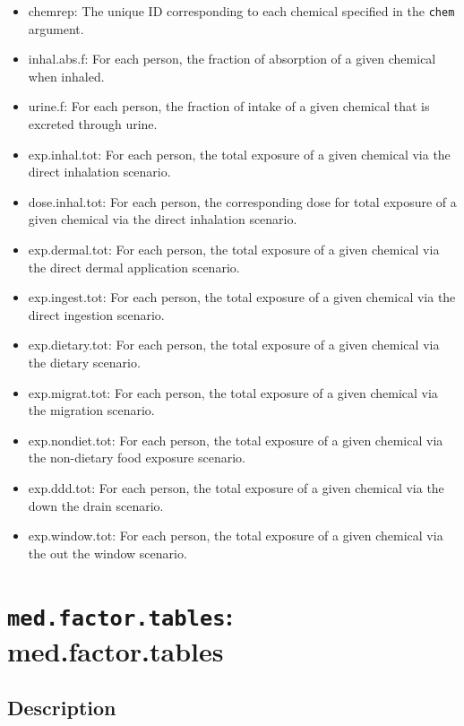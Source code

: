 \documentclass[
]{article}
\providecommand{\tightlist}{%
  \setlength{\itemsep}{0pt}\setlength{\parskip}{0pt}}
\begin{document}
\begin{itemize}
\tightlist
\item
  chemrep: The unique ID corresponding to each chemical specified in the
  \texttt{chem} argument.
\item
  inhal.abs.f: For each person, the fraction of absorption of a given
  chemical when inhaled.
\item
  urine.f: For each person, the fraction of intake of a given chemical
  that is excreted through urine.
\item
  exp.inhal.tot: For each person, the total exposure of a given chemical
  via the direct inhalation scenario.
\item
  dose.inhal.tot: For each person, the corresponding dose for total
  exposure of a given chemical via the direct inhalation scenario.
\item
  exp.dermal.tot: For each person, the total exposure of a given
  chemical via the direct dermal application scenario.
\item
  exp.ingest.tot: For each person, the total exposure of a given
  chemical via the direct ingestion scenario.
\item
  exp.dietary.tot: For each person, the total exposure of a given
  chemical via the dietary scenario.
\item
  exp.migrat.tot: For each person, the total exposure of a given
  chemical via the migration scenario.
\item
  exp.nondiet.tot: For each person, the total exposure of a given
  chemical via the non-dietary food exposure scenario.
\item
  exp.ddd.tot: For each person, the total exposure of a given chemical
  via the down the drain scenario.
\item
  exp.window.tot: For each person, the total exposure of a given
  chemical via the out the window scenario.
\end{itemize}

\hypertarget{med.factor.tables-med.factor.tables}{%
\section{\texorpdfstring{\texttt{med.factor.tables}:
med.factor.tables}{med.factor.tables: med.factor.tables}}\label{med.factor.tables-med.factor.tables}}

\hypertarget{description-29}{%
\subsection{Description}\label{description-29}}
\end{document}
